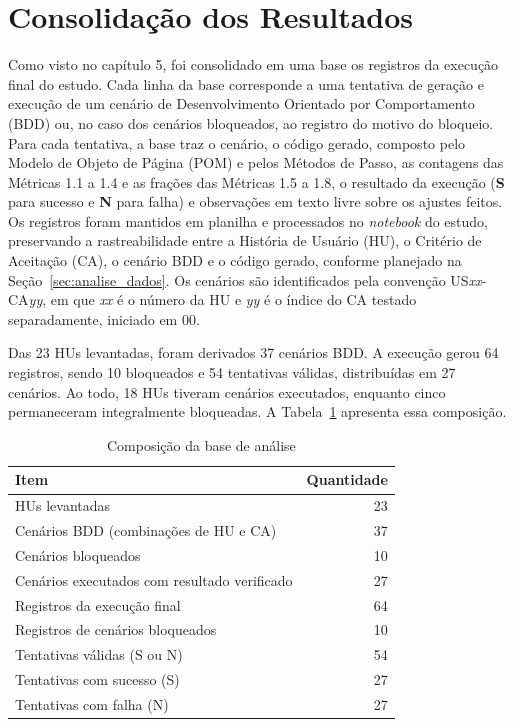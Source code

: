 \section{Consolidação dos Resultados}
\label{sec:consolidacao-resultados}

Como visto no capítulo 5, foi consolidado em uma base os registros da execução final do estudo. Cada linha da base corresponde a uma tentativa de geração e execução de um cenário de Desenvolvimento Orientado por Comportamento (BDD) ou, no caso dos cenários bloqueados, ao registro do motivo do bloqueio. Para cada tentativa, a base traz o cenário, o código gerado, composto pelo Modelo de Objeto de Página (POM) e pelos Métodos de Passo, as contagens das Métricas 1.1 a 1.4 e as frações das Métricas 1.5 a 1.8, o resultado da execução (\textbf{S} para sucesso e \textbf{N} para falha) e observações em texto livre sobre os ajustes feitos. Os registros foram mantidos em planilha e processados no \textit{notebook} do estudo, preservando a rastreabilidade entre a História de Usuário (HU), o Critério de Aceitação (CA), o cenário BDD e o código gerado, conforme planejado na Seção~\ref{sec:analise_dados}. Os cenários são identificados pela convenção US\textit{xx}-CA\textit{yy}, em que \textit{xx} é o número da HU e \textit{yy} é o índice do CA testado separadamente, iniciado em 00.

Das 23 HUs levantadas, foram derivados 37 cenários BDD. A execução gerou 64 registros, sendo 10 bloqueados e 54 tentativas válidas, distribuídas em 27 cenários. Ao todo, 18 HUs tiveram cenários executados, enquanto cinco permaneceram integralmente bloqueadas. A Tabela~\ref{tab:composicao-base} apresenta essa composição.

\begin{table}[htb]
\centering
\caption{Composição da base de análise}
\label{tab:composicao-base}
\begin{tabular}{lr}
\hline
\textbf{Item} & \textbf{Quantidade} \\
\hline
HUs levantadas & 23 \\
Cenários BDD (combinações de HU e CA) & 37 \\
\quad Cenários bloqueados & 10 \\
\quad Cenários executados com resultado verificado & 27 \\
Registros da execução final & 64 \\
\quad Registros de cenários bloqueados & 10 \\
\quad Tentativas válidas (S ou N) & 54 \\
\qquad Tentativas com sucesso (S) & 27 \\
\qquad Tentativas com falha (N) & 27 \\
\hline
\end{tabular}
\end{table}

